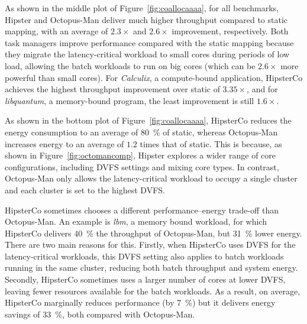  As shown in the middle plot of Figure~\ref{fig:coallocaaaa}, for all
benchmarks, Hipster and Octopus-Man deliver much high\-er throughput compared to static
mapping, with an average of $2.3\times$ and $2.6\times$ improvement, respectively. Both
task managers improve performance compared with the static mapping because they migrate
the latency-critical workload to small cores during periods of low load, allowing the
batch workloads to run on big cores (which can be $2.6\times$ more powerful than small
cores).  For \emph{Calculix}, a compute-bound application, HipsterCo achieves the highest
throughput improvement over static of $3.35\times$, and for \emph{libquantum}, a
memory-bound program, the least improvement is still $1.6\times$.  

As shown in the bottom plot of Figure~\ref{fig:coallocaaaa}, HipsterCo reduces the energy
consumption to an average of \SI{80}{\percent} of static, whereas Octopus-Man increases
energy to an average of $1.2$ times that of static. This is because, as shown in
Figure~\ref{fig:octomancomp}, Hipster explores a wider range of core configurations,
including DVFS settings and mixing core types. In contrast, Octopus-Man only allows the
latency-critical workload to occupy a single cluster and each cluster is set to the
highest DVFS. 

HipsterCo sometimes chooses a different performance--energy trade-off than Octopus-Man.
An example is \emph{lbm}, a memory bound workload, for which HipsterCo delivers
\SI{40}{\percent} the throughput of Octopus-Man, but \SI{31}{\percent} lower energy.
There are two main reasons for this.  Firstly, when HipsterCo uses DVFS for the
latency-critical workloads, this DVFS setting also applies to batch workloads running in
the same cluster, reducing both batch throughput and system energy. Secondly, HipsterCo
sometimes uses a larger number of cores at lower DVFS, leaving fewer resources available
for the batch workloads. As a result, on average, HipsterCo marginally reduces performance
(by \SI{7}{\percent}) but it delivers energy savings of \SI{33}{\percent}, both compared
with Octopus-Man.
